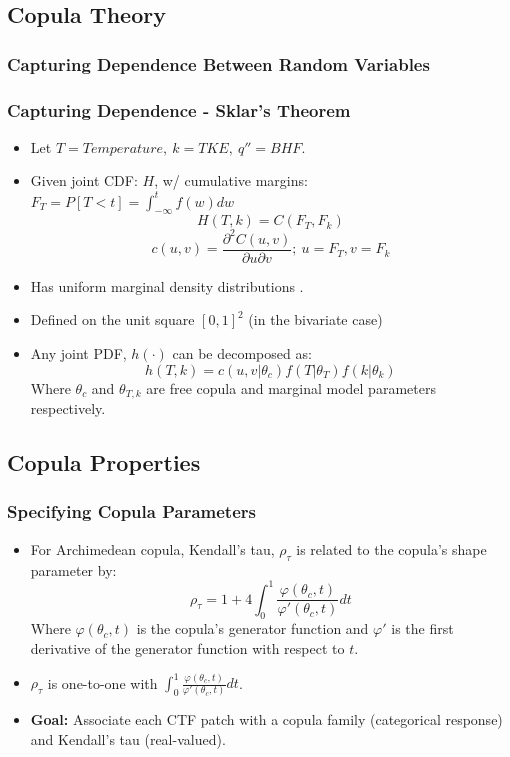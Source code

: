 \documentclass[t, pdftex]{beamer}
\begin{document}
\subsection*{Copula Theory}
\subsubsection*{Capturing Dependence Between Random Variables}
\begin{frame}
\frametitle{Capturing Dependence - Sklar's Theorem}
\vspace{-16.5pt}
\begin{itemize}
\item Let $T=Temperature,\ k=TKE,\ q''=BHF$.
\item Given joint CDF: $H$, w/ cumulative margins: $F_T=P[T < t] = \int_{-\infty}^{t}f(w)dw$
\[
H(T,k) = C(F_T, F_k)
\]
\[
c(u, v) = \frac{\partial^2 C(u, v)}{\partial u \partial v};\ u=F_T, v=F_k
\]
\item  Has uniform marginal density distributions \cite{Nelsen2006}.
\item  Defined on the unit square $[0, 1]^2$ (in the bivariate case)
\item  Any joint PDF, $h(\cdot)$ can be decomposed as: \\
\[
h(T, k) = c(u, v |\theta_c)f(T|\theta_T)f(k|\theta_k)
\]
Where $\theta_c$ and $\theta_{T,k}$ are free copula and marginal model parameters respectively.
\end{itemize}
\end{frame}

\subsection*{Copula Properties}
\begin{frame}[noframenumbering]
\frametitle{Specifying Copula Parameters}
\begin{itemize}
    \item For Archimedean copula, Kendall's tau, $\rho_\tau$ is
    related to the copula's shape parameter by:
    \[
    \rho_\tau = 1 + 4 \int_0^1 \frac{\varphi(\theta_c,t)}{\varphi'(\theta_c, t)}dt
    \]
    Where $\varphi(\theta_c, t)$ is the copula's generator function and $\varphi'$ is the first derivative of the generator function with respect to $t$.
    \item  $\rho_\tau$ is one-to-one with $\int_0^1 \frac{\varphi(\theta_c,t)}{\varphi'(\theta_c, t)}dt$.
    \item \textbf{Goal:} Associate each CTF patch with a copula family (categorical response) and Kendall's tau (real-valued).
\end{itemize}
\cite{Nelsen2006}
\end{frame}
\end{document}
